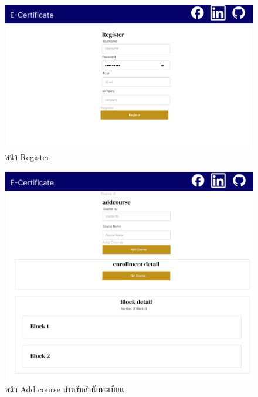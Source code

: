 \graphicspath{ {./images/} }
\begin{figure}[htbp]
  \centering 
  \includegraphics[scale=0.5]{figmaregis.png}
  \caption[Peers Diagram 5]{หน้า Register}
  \label{fig:register}
\end{figure}

\graphicspath{ {./images/} }
\begin{figure}[htbp]
  \centering 
  \includegraphics[scale=0.5]{figmaadd.png}
  \caption[Peers Diagram 5]{หน้า Add course สำหรับสำนักทะเบียน}
  \label{fig:adding}
\end{figure}

